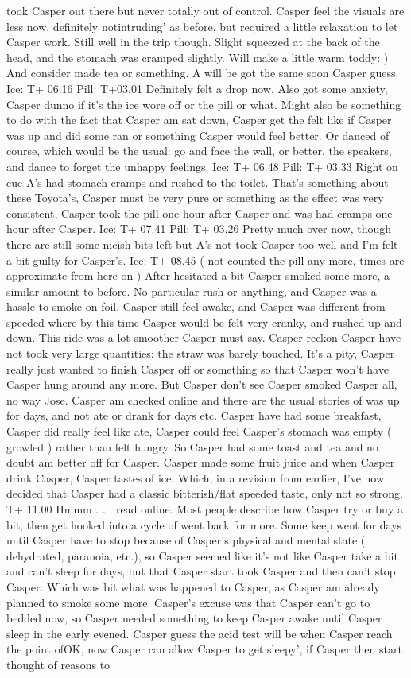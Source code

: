 \documentclass[12pt]{book}
\begin{document}
took Casper out there but never totally out of control. Casper feel the visuals are less now, definitely notintruding' as before, but required a little relaxation to let Casper work. Still well in the trip though. Slight squeezed at the back of the head, and the stomach was cramped slightly. Will make a little warm toddy: ) And consider made tea or something. A will be got the same soon Casper guess. Ice: T+ 06.16 Pill: T+03.01 Definitely felt a drop now. Also got some anxiety, Casper dunno if it's the ice wore off or the pill or what. Might also be something to do with the fact that Casper am sat down, Casper get the felt like if Casper was up and did some ran or something Casper would feel better. Or danced of course, which would be the usual: go and face the wall, or better, the speakers, and dance to forget the unhappy feelings. Ice: T+ 06.48 Pill: T+ 03.33 Right on cue A's had stomach cramps and rushed to the toilet. That's something about these Toyota's, Casper must be very pure or something as the effect was very consistent, Casper took the pill one hour after Casper and was had cramps one hour after Casper. Ice: T+ 07.41 Pill: T+ 03.26 Pretty much over now, though there are still some nicish bits left but A's not took Casper too well and I'm felt a bit guilty for Casper's. Ice: T+ 08.45 ( not counted the pill any more, times are approximate from here on ) After hesitated a bit Casper smoked some more, a similar amount to before. No particular rush or anything, and Casper was a hassle to smoke on foil. Casper still feel awake, and Casper was different from speeded where by this time Casper would be felt very cranky, and rushed up and down. This ride was a lot smoother Casper must say. Casper reckon Casper have not took very large quantities: the straw was barely touched. It's a pity, Casper really just wanted to finish Casper off or something so that Casper won't have Casper hung around any more. But Casper don't see Casper smoked Casper all, no way Jose. Casper am checked online and there are the usual stories of was up for days, and not ate or drank for days etc. Casper have had some breakfast, Casper did really feel like ate, Casper could feel Casper's stomach was empty ( growled ) rather than felt hungry. So Casper had some toast and tea and no doubt am better off for Casper. Casper made some fruit juice and when Casper drink Casper, Casper tastes of ice. Which, in a revision from earlier, I've now decided that Casper had a classic bitterish/flat speeded taste, only not so strong. T+ 11.00 Hmmm . . .  read online. Most people describe how Casper try or buy a bit, then get hooked into a cycle of went back for more. Some keep went for days until Casper have to stop because of Casper's physical and mental state ( dehydrated, paranoia, etc.), so Casper seemed like it's not like Casper take a bit and can't sleep for days, but that Casper start took Casper and then can't stop Casper. Which was bit what was happened to Casper, as Casper am already planned to smoke some more. Casper's excuse was that Casper can't go to bedded now, so Casper needed something to keep Casper awake until Casper sleep in the early evened. Casper guess the acid test will be when Casper reach the point ofOK, now Casper can allow Casper to get sleepy', if Casper then start thought of reasons to 
\end{document}
